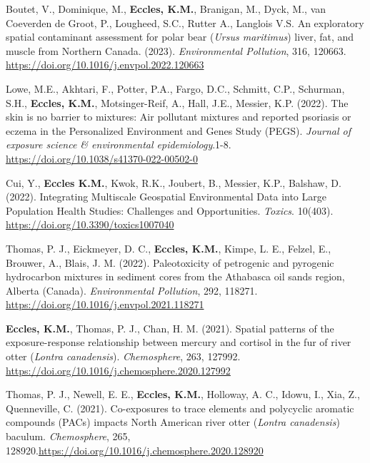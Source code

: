 \documentclass[margin,line]{res}
\begin{document}
\begin{resume}
\begin{etaremune}[start=26]
\item Boutet, V., Dominique, M., \textbf{Eccles, K.M.}, Branigan, M., Dyck, M., van Coeverden de Groot, P., Lougheed, S.C., Rutter A., Langlois V.S. An exploratory spatial contaminant assessment for polar bear (\textit{Ursus maritimus}) liver, fat, and muscle from Northern Canada. (2023). \textit{Environmental Pollution}, 316, 120663. \url{https://doi.org/10.1016/j.envpol.2022.120663}

\item Lowe, M.E., Akhtari, F., Potter, P.A., Fargo, D.C., Schmitt, C.P., Schurman, S.H., \textbf{Eccles, K.M.}, Motsinger-Reif, A., Hall, J.E., Messier, K.P. (2022). The skin is no barrier to mixtures: Air pollutant mixtures and reported
psoriasis or eczema in the Personalized Environment and Genes Study (PEGS). \textit{Journal of exposure science \& environmental epidemiology}.1-8. \url{https://doi.org/10.1038/s41370-022-00502-0}

\item Cui, Y., \textbf{Eccles K.M.}, Kwok, R.K., Joubert, B., Messier, K.P., Balshaw, D. (2022). Integrating Multiscale Geospatial Environmental Data into Large Population Health Studies: Challenges and Opportunities. \textit{Toxics}. 10(403). \url{https://doi.org/10.3390/toxics1007040}

\item Thomas, P. J., Eickmeyer, D. C., \textbf{Eccles, K.M.}, Kimpe, L. E., Felzel, E., Brouwer, A., Blais, J. M. (2022). Paleotoxicity of petrogenic and pyrogenic hydrocarbon mixtures in sediment cores from the Athabasca oil sands region, Alberta (Canada). \textit{Environmental Pollution}, 292, 118271. \url{https://doi.org/10.1016/j.envpol.2021.118271}

\item \textbf{Eccles, K.M.}, Thomas, P. J., Chan, H. M. (2021). Spatial patterns of the exposure-response relationship between mercury and cortisol in the fur of river otter (\textit{Lontra canadensis}). \textit{Chemosphere}, 263, 127992. \url{https://doi.org/10.1016/j.chemosphere.2020.127992}

\item Thomas, P. J., Newell, E. E., \textbf{Eccles, K.M.}, Holloway, A. C., Idowu, I., Xia, Z., Quenneville, C. (2021). Co-exposures to trace elements and polycyclic aromatic compounds (PACs) impacts North American river otter (\textit{Lontra canadensis}) baculum. \textit{Chemosphere}, 265, 128920.\url{https://doi.org/10.1016/j.chemosphere.2020.128920}


\end{etaremune}
\end{resume}
\end{document}
